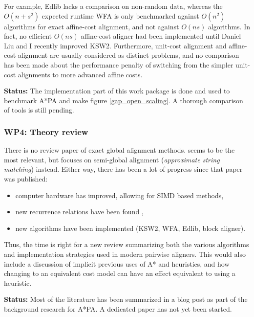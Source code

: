 \documentclass[11pt,english,a4paper]{article}
\begin{document}
For example, Edlib \autocite{edlib} lacks a comparison on non-random data, whereas
the \(O(n+s^2)\) expected runtime WFA \autocite{wfa} is only benchmarked against
\(O(n^2)\) algorithms for exact affine-cost alignment, and not against \(O(ns)\)
algorithms. In fact, no efficient \(O(ns)\) affine-cost aligner had been
implemented until Daniel Liu and I recently improved KSW2. Furthermore,
unit-cost alignment and affine-cost alignment are usually considered as distinct
problems, and no comparison has been made about the performance penalty of
switching from the simpler unit-cost alignments to more advanced affine costs.

\textbf{Status:} The implementation part of this work package is done and used to
benchmark A*PA and make figure \ref{gap_open_scaling}. A thorough comparison of tools
is still pending.

\subsubsection{WP4: Theory review}
\label{sec:org699015d}
There is no review paper of exact global alignment methods.
\textcite{navarro01} seems to be the most relevant,
but focuses on semi-global alignment (\emph{approximate string matching}) instead.
Either way, there has been a lot of progress since
that paper was published:
\begin{itemize}
\item computer hardware has improved, allowing for SIMD based methods,
\item new recurrence relations have been found \autocite{difference-recurrence-relations},
\item new algorithms have been implemented (KSW2, WFA, Edlib, block aligner).
\end{itemize}
Thus, the time is right for a new review summarizing both the
various algorithms and implementation strategies used in modern pairwise
aligners.
This would also include a discussion of implicit previous uses of A* and
heuristics, and how changing to an equivalent cost model can have an effect equivalent
to using a heuristic.

\textbf{Status:} Most of the literature has been summarized in a blog post as part of
the background research for A*PA. A dedicated paper has not yet been started.
\end{document}
